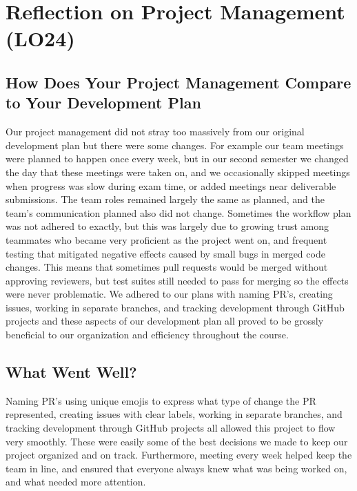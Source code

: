 \documentclass{article}
\begin{document}
\section{Reflection on Project Management (LO24)}


\subsection{How Does Your Project Management Compare to Your Development Plan}


Our project management did not stray too massively from our original development plan but there were some changes. For example our team meetings were planned to happen once every week, but in our second semester we changed the day that these meetings were taken on, and we occasionally skipped meetings when progress was slow during exam time, or added meetings near deliverable submissions. The team roles remained largely the same as planned, and the team's communication planned also did not change. Sometimes the workflow plan was not adhered to exactly, but this was largely due to growing trust among teammates who became very proficient as the project went on, and frequent testing that mitigated negative effects caused by small bugs in merged code changes. This means that sometimes pull requests would be merged without approving reviewers, but test suites still needed to pass for merging so the effects were never problematic. We adhered to our plans with naming PR's, creating issues, working in separate branches, and tracking development through GitHub projects and these aspects of our development plan all proved to be grossly beneficial to our organization and efficiency throughout the course.


\subsection{What Went Well?}


Naming PR's using unique emojis to express what type of change the PR represented, creating issues with clear labels, working in separate branches, and tracking development through GitHub projects all allowed this project to flow very smoothly. These were easily some of the best decisions we made to keep our project organized and on track. Furthermore, meeting every week helped keep the team in line, and ensured that everyone always knew what was being worked on, and what needed more attention.
\end{document}
